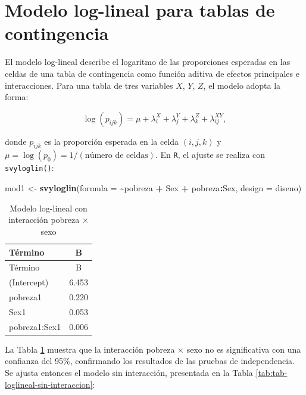 \documentclass[
  spanish,
  12pt,
]{book}
\newenvironment{Shaded}{\begin{snugshade}}{\end{snugshade}}
\newcommand{\AttributeTok}[1]{\textcolor[rgb]{0.13,0.29,0.53}{#1}}
\newcommand{\FunctionTok}[1]{\textcolor[rgb]{0.13,0.29,0.53}{\textbf{#1}}}
\newcommand{\NormalTok}[1]{#1}
\newcommand{\OtherTok}[1]{\textcolor[rgb]{0.56,0.35,0.01}{#1}}
\newcommand{\SpecialCharTok}[1]{\textcolor[rgb]{0.81,0.36,0.00}{\textbf{#1}}}
\begin{document}
\section{Modelo log-lineal para tablas de contingencia}\label{sec-loglineal}

El modelo log-lineal describe el logaritmo de las proporciones esperadas en las celdas de una tabla de contingencia como función aditiva de efectos principales e interacciones. Para una tabla de tres variables \(X\), \(Y\), \(Z\), el modelo adopta la forma:

\[
\log(p_{ijk}) = \mu + \lambda_i^X + \lambda_j^Y + \lambda_k^Z + \lambda_{ij}^{XY},
\]

donde \(p_{ijk}\) es la proporción esperada en la celda \((i,j,k)\) y \(\mu = \log(p_0) = 1/(\text{número de celdas})\). En \texttt{R}, el ajuste se realiza con \texttt{svyloglin()}:

\begin{Shaded}
\begin{Highlighting}[]
\NormalTok{mod1 }\OtherTok{\textless{}{-}} \FunctionTok{svyloglin}\NormalTok{(}\AttributeTok{formula =} \SpecialCharTok{\textasciitilde{}}\NormalTok{pobreza }\SpecialCharTok{+}\NormalTok{ Sex }\SpecialCharTok{+}\NormalTok{ pobreza}\SpecialCharTok{:}\NormalTok{Sex,}
                  \AttributeTok{design  =}\NormalTok{ diseno)}
\end{Highlighting}
\end{Shaded}

\begin{longtable}[]{@{}lc@{}}
\caption{\label{tab:tab-loglineal-interaccion}Modelo log-lineal con interacción pobreza × sexo}\tabularnewline
\toprule\noalign{}
Término & B \\
\midrule\noalign{}
\endfirsthead
\toprule\noalign{}
Término & B \\
\midrule\noalign{}
\endhead
\bottomrule\noalign{}
\endlastfoot
(Intercept) & 6.453 \\
pobreza1 & 0.220 \\
Sex1 & 0.053 \\
pobreza1:Sex1 & 0.006 \\
\end{longtable}

La Tabla \ref{tab:tab-loglineal-interaccion} muestra que la interacción pobreza × sexo no es significativa con una confianza del 95\%, confirmando los resultados de las pruebas de independencia. Se ajusta entonces el modelo sin interacción, presentada en la Tabla \ref{tab:tab-loglineal-sin-interaccion}:
\end{document}
